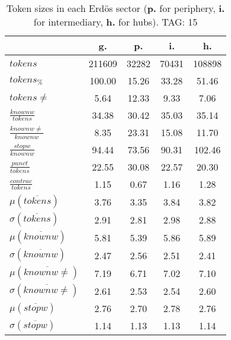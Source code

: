 \begin{table}[h!]
\begin{center}
\begin{tabular}{| l || c | c | c | c |}\hline
 & {\bf g.} & {\bf p.} & {\bf i.} & {\bf h.} \\\hline\hline
$tokens$ & 211609  & 32282  & 70431  & 108898 \\
$tokens_{\%}$ & 100.00  & 15.26  & 33.28  & 51.46 \\
$tokens \neq$ & 5.64  & 12.33  & 9.33  & 7.06 \\\hline
$\frac{knownw}{tokens}$ & 34.38  & 30.42  & 35.03  & 35.14 \\
$\frac{knownw \neq}{knownw}$ & 8.35  & 23.31  & 15.08  & 11.70 \\\hline
$\frac{stopw}{knownw}$ & 94.44  & 73.56  & 90.31  & 102.46 \\
$\frac{punct}{tokens}$ & 22.55  & 30.08  & 22.57  & 20.30 \\
$\frac{contrac}{tokens}$ & 1.15  & 0.67  & 1.16  & 1.28 \\\hline\hline
$\mu(\overline{tokens})$ & 3.76  & 3.35  & 3.84  & 3.82 \\
$\sigma(\overline{tokens})$ & 2.91  & 2.81  & 2.98  & 2.88 \\\hline
$\mu(\overline{knownw})$ & 5.81  & 5.39  & 5.86  & 5.89 \\
$\sigma(\overline{knownw})$ & 2.47  & 2.56  & 2.51  & 2.41 \\\hline
$\mu(\overline{knownw \neq})$ & 7.19  & 6.71  & 7.02  & 7.10 \\
$\sigma(\overline{knownw \neq})$ & 2.61  & 2.53  & 2.54  & 2.60 \\\hline
$\mu(\overline{stopw})$ & 2.76  & 2.70  & 2.78  & 2.76 \\
$\sigma(\overline{stopw})$ & 1.14  & 1.13  & 1.13  & 1.14 \\\hline
\end{tabular}
\caption{Token sizes in each Erd\"os sector ({{\bf p.}} for periphery, {{\bf i.}} for intermediary, {{\bf h.}} for hubs). TAG: 15}
\end{center}
\end{table}